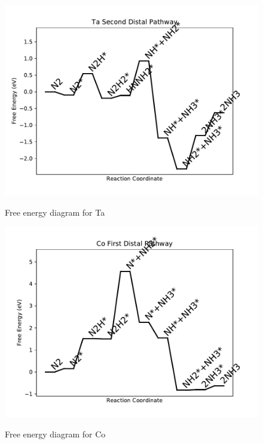 \documentclass{article}
\begin{document}
\newpage
\begin{figure}
\includegraphics[width=1\linewidth]{data/plots/Ta_distal_2.pdf}
\label{fig:Ta_distal_2}
\caption{Free energy diagram for Ta}
\end{figure}

\begin{figure}
\includegraphics[width=1\linewidth]{data/plots/Co_distal_1.pdf}
\label{fig:Co_distal_1}
\caption{Free energy diagram for Co}
\end{figure}
\end{document}
